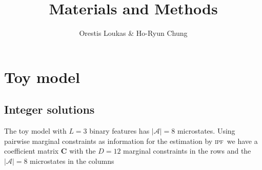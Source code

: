 \documentclass[
]{article}
\title{Materials and Methods}
\author{Orestis Loukas \& Ho-Ryun Chung}
\date{}
\newcommand{\abs}[1]{\left\vert#1\right\vert} %
\newcommand{\dimstatespace}{{\abs{\mathcal{A}}}}
\newcommand{\ipf}{\textsc{ipf}~}
\begin{document}
\maketitle

\hypertarget{toy-model}{%
\section{Toy model}\label{toy-model}}

\hypertarget{integer-solutions}{%
\subsection{Integer solutions}\label{integer-solutions}}

The toy model with \(L = 3\) binary features has \(\dimstatespace = 8\)
microstates. Using pairwise marginal constraints as information for the
estimation by \ipf we have a coefficient matrix \(\mathbf{C}\) with the
\(D = 12\) marginal constraints in the rows and the
\(\dimstatespace = 8\) microstates in the columns
\end{document}
